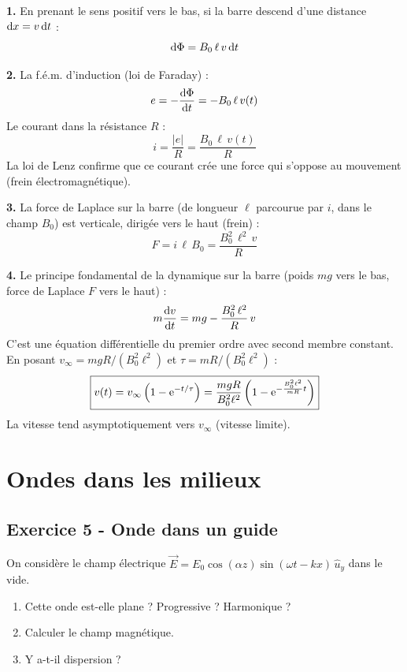 \documentclass[12pt,a4paper]{article}
\begin{document}
\begin{boitecorrige}
\textbf{1.} En prenant le sens positif vers le bas, si la barre descend d'une distance $\mathrm{d} x = v\,\mathrm{d} t$ :
\[
\mathrm{d}\Phi = B_0\,\ell\,v\,\mathrm{d} t
\]

\textbf{2.} La f.é.m. d'induction (loi de Faraday) :
\[
e = -\dfrac{\mathrm{d} \Phi}{\mathrm{d} t} = -B_0\,\ell\,v(t)
\]
Le courant dans la résistance $R$ :
\[
i = \frac{|e|}{R} = \frac{B_0\,\ell\,v(t)}{R}
\]
La loi de Lenz confirme que ce courant crée une force qui s'oppose au mouvement (frein électromagnétique).

\textbf{3.} La force de Laplace sur la barre (de longueur $\ell$ parcourue par $i$, dans le champ $B_0$) est verticale, dirigée vers le haut (frein) :
\[
F = i\,\ell\,B_0 = \frac{B_0^2\,\ell^2\,v}{R}
\]

\textbf{4.} Le principe fondamental de la dynamique sur la barre (poids $mg$ vers le bas, force de Laplace $F$ vers le haut) :
\[
m\dfrac{\mathrm{d} v}{\mathrm{d} t} = mg - \frac{B_0^2\,\ell^2}{R}\,v
\]
C'est une équation différentielle du premier ordre avec second membre constant. En posant $v_\infty = mgR/(B_0^2\ell^2)$ et $\tau = mR/(B_0^2\ell^2)$ :
\[
\boxed{v(t) = v_\infty\left(1 - \mathrm{e}^{-t/\tau}\right) = \frac{mgR}{B_0^2\ell^2}\left(1 - \mathrm{e}^{-\frac{B_0^2\ell^2}{mR}t}\right)}
\]
La vitesse tend asymptotiquement vers $v_\infty$ (vitesse limite).
\end{boitecorrige}

\section{Ondes dans les milieux}

\subsection*{Exercice 5 - Onde dans un guide \niveau{\difficile}}

\begin{boiteexercice}
On considère le champ électrique $\vec{E} = E_0\cos(\alpha z)\sin(\omega t - kx)\,\hat{u}_y$ dans le vide.
\begin{enumerate}
  \item Cette onde est-elle plane ? Progressive ? Harmonique ?
  \item Calculer le champ magnétique.
  \item Y a-t-il dispersion ?
\end{enumerate}
\end{boiteexercice}
\end{document}
